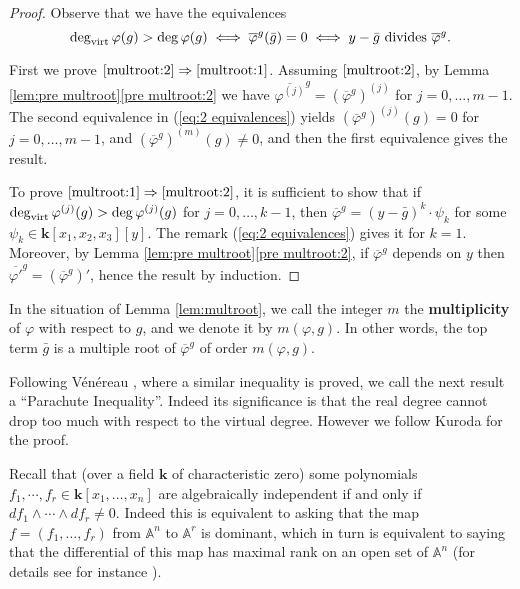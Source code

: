 \documentclass[reqno,oneside,11pt]{amsart}
\theoremstyle{plain}
\theoremstyle{definition}
\newcommand{\A}{{\mathbb{A}}}
\newcommand{\K}{\mathbf{k}}
\renewcommand{\phi}{\varphi}
\newcommand{\dvirt}{\deg_{\text{\rm virt}}}
\newcommand{\topcomp}[2]{\overline{#1}^{#2}}
\begin{document}
\begin{proof}
Observe that we have the equivalences
\begin{equation} \label{eq:2 equivalences}
\dvirt \phi(g) > \deg \phi(g) \;\Longleftrightarrow\; \topcomp{\phi}{g}(\bar
g) = 0 \;\Longleftrightarrow\; y-\bar g \text{ divides } \topcomp{\phi}{g}.
\end{equation}

First we prove $\ref{multroot:2} \Rightarrow \ref{multroot:1}$.
Assuming $\ref{multroot:2}$, by Lemma \ref{lem:pre multroot}\ref{pre
multroot:2} we have $\topcomp{\phi^{(j)}}{g} = (\topcomp{\phi}{g})^{(j)}$ for
$j = 0, \dots, m-1$.
The second equivalence in (\ref{eq:2 equivalences}) yields
$(\topcomp{\phi}{g})^{(j)}(g) = 0$ for $j = 0, \dots, m-1$, and
$(\topcomp{\phi}{g})^{(m)}(g) \neq 0$, and then the first equivalence gives the
result.

To prove $\ref{multroot:1} \Rightarrow \ref{multroot:2}$, it is sufficient to
show that if $\dvirt \phi^{(j)}(g) > \deg \phi^{(j)}(g)$ for $j = 0, \dots,
k-1$, then $\topcomp{\phi}{g} = (y - \bar g)^k \cdot \psi_k$ for some $\psi_k
\in \K[x_1, x_2, x_3][y]$.
The remark (\ref{eq:2 equivalences}) gives it for $k = 1$.
Moreover, by Lemma \ref{lem:pre multroot}\ref{pre multroot:2},  if
$\topcomp{\phi}{g}$ depends on $y$ then
$\topcomp{\phi'}{g} = (\topcomp{\phi}{g})'$, hence the result by induction.
\end{proof}

In the situation of Lemma \ref{lem:multroot}, we call the integer $m$ the \textbf{multiplicity} of $\phi$ with respect to $g$, and we denote it by $m(\phi,g)$.
In other words, the top term $\bar g$ is a multiple root of $\topcomp{\phi}{g}$ of order $m(\phi,g)$.

Following Vénéreau \cite{V}, where a similar inequality is proved, we call the next result a ``Parachute Inequality''.
Indeed its significance is that the real degree cannot drop too much with respect to the virtual degree.
However we follow Kuroda for the proof.

Recall that (over a field $\K$ of characteristic zero) some polynomials $f_1,
\cdots, f_r \in \K[x_1, \dots, x_n]$ are algebraically independent if and only
if
$df_1 \wedge \cdots \wedge df_r \neq 0$.
Indeed this is equivalent to asking that the map $f = (f_1, \dots, f_r)$ from
$\A^n$ to $\A^r$ is dominant, which in turn is equivalent to saying that the
differential of this map has maximal rank on an open set of $\A^n$
(for details see for instance \cite[Theorem III p.135]{HP}).
\end{document}
